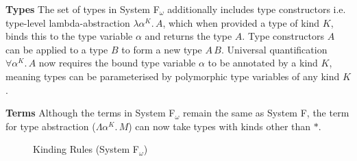 \documentclass[acmsmall, 9pt]{article}
\begin{document}
\noindent
\textbf{Types} The set of types in System F$_\omega$ additionally includes type constructors i.e. type-level lambda-abstraction $\lambda \alpha^K. \, A$, which when provided a type of kind $K$, binds this to the type variable $\alpha$ and returns the type $A$. Type constructors $A$ can be applied to a type $B$ to form a new type $A\, B$. Universal quantification $\forall \alpha^K . \, A$ now requires the bound type variable $\alpha$ to be annotated by a kind $K$, meaning types can be parameterised by polymorphic type variables of any kind $K$.



\noindent
\textbf{Terms} Although the terms in System F$_\omega$ remain the same as System F, the term for type abstraction ($\Lambda \alpha^K . \, M$) can now take types with kinds other than $*$.

\begin{figure}[H]
\flushleft {}
\caption{Kinding Rules (System F$_\omega$)}
\end{figure}
\end{document}
